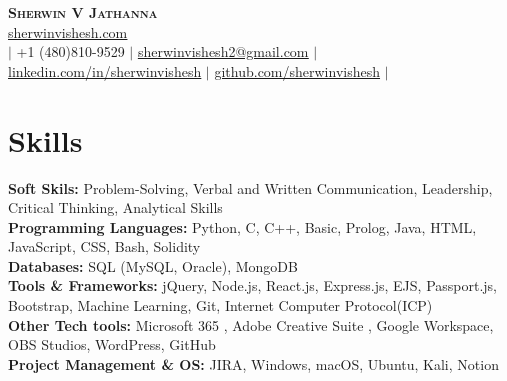\documentclass[letterpaper,11pt]{article}
\begin{document}

\begin{center}
    \textbf{\Huge \scshape Sherwin V Jathanna} \\ \vspace{1pt}
     \href{https://sherwinvishesh.com}{\underline{sherwinvishesh.com}} 
   \\ \small $|$ +1 (480)810-9529 $|$ \href{mailto:sherwinvishesh2@gmail.com}{\underline{sherwinvishesh2@gmail.com}} $|$ 
    \href{https://linkedin.com/in/sherwinvishesh}{\underline{linkedin.com/in/sherwinvishesh}} $|$
    \href{https://github.com/sherwinvishesh}{\underline{github.com/sherwinvishesh}} $|$
     \\ 
\end{center}


\section{Skills}
 \begin{itemize}[leftmargin=0.15in, label={}]
    \small{\item{
    \textbf{Soft Skils:}{ Problem-Solving, Verbal and Written Communication, Leadership, Critical Thinking, Analytical Skills} \\
     \textbf{Programming Languages:}{ Python, C, C++, Basic, Prolog, Java, HTML, JavaScript, CSS,  Bash, Solidity} \\
     \textbf{Databases:}{ SQL (MySQL, Oracle), MongoDB} \\
     \textbf{Tools \& Frameworks:}{ jQuery, Node.js, React.js, Express.js, EJS, Passport.js, Bootstrap, Machine Learning, Git,  Internet Computer Protocol(ICP) } \\
     \textbf{Other Tech tools:}{ Microsoft 365 , Adobe Creative Suite
, Google Workspace, OBS Studios, WordPress, GitHub } \\
     \textbf{Project Management \& OS: }{ JIRA, Windows, macOS, Ubuntu, Kali, Notion}
    }}
 \end{itemize}
\end{document}
